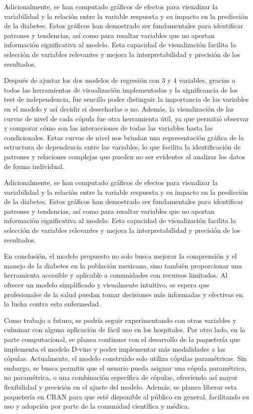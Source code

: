 Adicionalmente, se han computado gráficos de efectos para visualizar la variabilidad y la relación entre la variable respuesta y su impacto en la predicción de la diabetes. Estos gráficos han demostrado ser fundamentales para identificar patrones y tendencias, así como para resaltar variables que no aportan información significativa al modelo. Esta capacidad de visualización facilita la selección de variables relevantes y mejora la interpretabilidad y precisión de los resultados.

Después de ajustar los dos modelos de regresión con 3 y 4 variables, gracias a todas las herramientas de visualización implementadas y la significancia de los test de independencia, fue sencillo poder distinguir la importancia de las variables en el modelo y así decidir si desecharlas o no. Además, la visualización de las curvas de nivel de cada cópula fue otra herramienta útil, ya que permitió observar y comparar cómo son las interacciones de todas las variables hasta las condicionales. Estas curvas de nivel nos brindan una representación gráfica de la estructura de dependencia entre las variables, lo que facilita la identificación de patrones y relaciones complejas que pueden no ser evidentes al analizar los datos de forma individual.

Adicionalmente, se han computado gráficos de efectos para visualizar la variabilidad y la relación entre la variable respuesta y su impacto en la predicción de la diabetes. Estos gráficos han demostrado ser fundamentales para identificar patrones y tendencias, así como para resaltar variables que no aportan información significativa al modelo. Esta capacidad de visualización facilita la selección de variables relevantes y mejora la interpretabilidad y precisión de los resultados.

En conclusión, el modelo propuesto no solo busca mejorar la comprensión y el manejo de la diabetes en la población mexicana, sino también proporcionar una herramienta accesible y aplicable a comunidades con recursos limitados. Al ofrecer un modelo simplificado y visualmente intuitivo, se espera que profesionales de la salud puedan tomar decisiones más informadas y efectivas en la lucha contra esta enfermedad.

Como trabajo a futuro, se podría seguir experimentando con otras variables y culminar con alguna aplicación de fácil uso en los hospitales. Por otro lado, en la parte computacional, se planea continuar con el desarrollo de la paquetería que implementa el modelo D-vine y poder implementar más modalidades a las cópulas. Actualmente, el modelo construido solo utiliza cópulas paramétricas. Sin embargo, se busca permitir que el usuario pueda asignar una cópula paramétrica, no paramétrica, o una combinación específica de cópulas, ofreciendo así mayor flexibilidad y precisión en el ajuste del modelo. Además, se planea liberar esta paquetería en CRAN para que esté disponible al público en general, facilitando su uso y adopción por parte de la comunidad científica y médica.